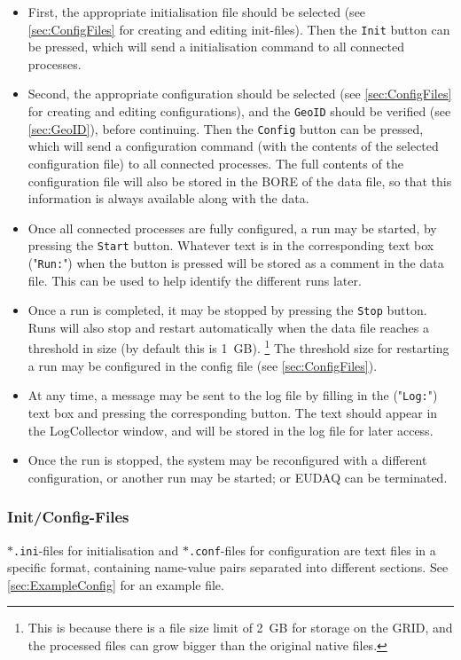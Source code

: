 \begin{itemize}
\item First, the appropriate initialisation file should be selected (see \autoref{sec:ConfigFiles} for creating and editing init-files). Then the \texttt{Init} button can be pressed,
which will send a initialisation command to all connected processes.

\item Second, the appropriate configuration should be selected 
(see \autoref{sec:ConfigFiles} for creating and editing configurations),
and the \texttt{GeoID} should be verified (see \autoref{sec:GeoID}), before continuing.
Then the \texttt{Config} button can be pressed,
which will send a configuration command
(with the contents of the selected configuration file) to all connected processes.
The full contents of the configuration file will also be stored
in the \gls{BORE} of the data file,
so that this information is always available along with the data.
\item Once all connected processes are fully configured, a run may be started, by pressing the \texttt{Start} button.
Whatever text is in the corresponding text box ("\texttt{Run:}") when the button is pressed
will be stored as a comment in the data file.
This can be used to help identify the different runs later.
\item Once a run is completed, it may be stopped by pressing the \texttt{Stop} button.
Runs will also stop and restart automatically when the data file reaches a threshold in size (by default this is 1~GB).%
\footnote{This is because there is a file size limit of 2~GB for storage on the GRID,
and the processed files can grow bigger than the original native files.}
The threshold size for restarting a run may be configured in the config file (see \autoref{sec:ConfigFiles}).
\item At any time, a message may be sent to the log file by filling in the ("\texttt{Log:}") text box and pressing the corresponding button.
The text should appear in the LogCollector window, and will be stored in the log file for later access.
\item Once the run is stopped, the system may be reconfigured with a different configuration, or another run may be started; or EUDAQ can be terminated.

\end{itemize}

\subsubsection{Init/Config-Files}\label{sec:ConfigFiles}
\texttt{$\ast$.ini}-files for initialisation and \texttt{$\ast$.conf}-files for configuration
are text files in a specific format, containing name-value pairs separated into different sections.
See \autoref{sec:ExampleConfig} for an example file.

